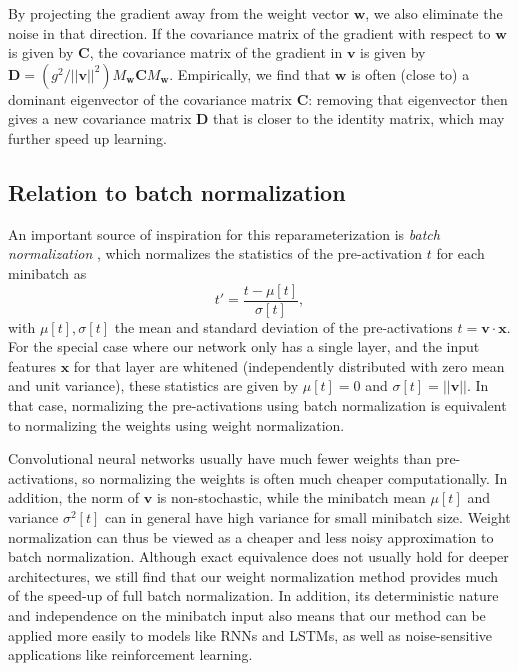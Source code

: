 \documentclass{article}
\newcommand{\bx}{\mathbf{x}}
\newcommand{\bv}{\mathbf{v}}
\newcommand{\bw}{\mathbf{w}}
\newcommand{\bC}{\mathbf{C}}
\newcommand{\bD}{\mathbf{D}}
\begin{document}
By projecting the gradient away from the weight vector $\bw$, we also eliminate the noise in that direction. If the covariance matrix of the gradient with respect to $\bw$ is given by $\bC$, the covariance matrix of the gradient in $\bv$ is given by $\bD = (g^{2}/||\bv||^{2}) M_{\bw} \bC M_{\bw}$. Empirically, we find that $\bw$ is often (close to) a dominant eigenvector of the covariance matrix $\bC$: removing that eigenvector then gives a new covariance matrix $\bD$ that is closer to the identity matrix, which may further speed up learning.

\subsection{Relation to batch normalization}
An important source of inspiration for this reparameterization is \emph{batch normalization} \cite{ioffe2015batch}, which normalizes the statistics of the pre-activation $t$ for each minibatch as
\[
t' = \frac{t - \mu[t]}{\sigma[t]},
\]
with $\mu[t], \sigma[t]$ the mean and standard deviation of the pre-activations $t = \bv\cdot\bx$. For the special case where our network only has a single layer, and the input features $\bx$ for that layer are whitened (independently distributed with zero mean and unit variance), these statistics are given by $\mu[t]=0$ and $\sigma[t] = ||\bv||$. In that case, normalizing the pre-activations using batch normalization is equivalent to normalizing the weights using weight normalization. 

Convolutional neural networks usually have much fewer weights than pre-activations, so normalizing the weights is often much cheaper computationally. In addition, the norm of $\bv$ is non-stochastic, while the minibatch mean $\mu[t]$ and variance $\sigma^{2}[t]$ can in general have high variance for small minibatch size. Weight normalization can thus be viewed as a cheaper and less noisy approximation to batch normalization. Although exact equivalence does not usually hold for deeper architectures, we still find that our weight normalization method provides much of the speed-up of full batch normalization. In addition, its deterministic nature and independence on the minibatch input also means that our method can be applied more easily to models like RNNs and LSTMs, as well as noise-sensitive applications like reinforcement learning.
\end{document}
